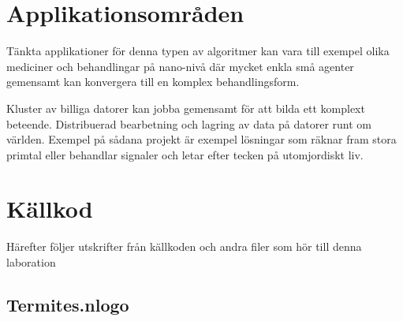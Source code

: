 \documentclass[titlepage, a4paper, 12pt]{article}
\begin{document}
\section{Applikationsområden}

Tänkta applikationer för denna typen av algoritmer kan vara till
exempel olika mediciner och behandlingar på nano-nivå där mycket enkla
små agenter gemensamt kan konvergera till en komplex behandlingsform.

Kluster av billiga datorer kan jobba gemensamt för att bilda ett
komplext beteende. Distribuerad bearbetning och lagring av data på
datorer runt om världen. Exempel på sådana projekt är exempel
lösningar som räknar fram stora primtal eller behandlar signaler och
letar efter tecken på utomjordiskt liv.

\newpage
\appendix
{}
\section{Källkod}\label{sec:kallkod}
Härefter följer utskrifter från källkoden och andra filer som hör till
denna laboration

\subsection{Termites.nlogo}\label{Termites.nlogo}
\begin{footnotesize}
  
\end{footnotesize}
\end{document}
